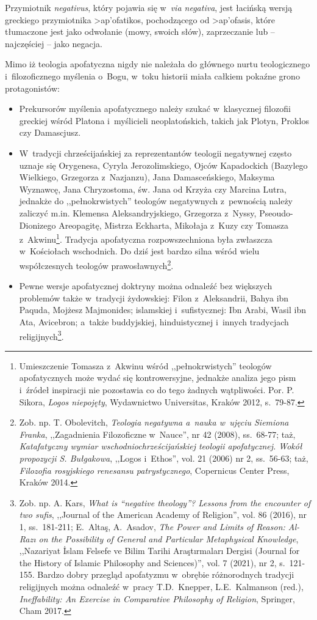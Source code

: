 Przymiotnik \textit{negativus}, który pojawia się w~\textit{via negativa}, jest łacińską wersją greckiego przymiotnika \textgreek{>ap'ofatikos}, pochodzącego od \textgreek{>ap'ofasis}, które tłumaczone jest jako odwołanie (mowy, swoich słów), zaprzeczanie lub -- najczęściej -- jako negacja.

Mimo iż teologia apofatyczna nigdy nie należała do głównego nurtu teologicznego i~filozoficznego myślenia o~Bogu, w~toku historii miała całkiem pokaźne grono protagonistów:

\begin{itemize}
\item Prekursorów myślenia apofatycznego należy szukać w~klasycznej filozofii greckiej wśród Platona i~myślicieli neoplatońskich, takich jak Plotyn, Proklos czy Damascjusz.
\item W~tradycji chrześcijańskiej za reprezentantów teologii negatywnej często uznaje się Orygenesa, Cyryla Jerozolimskiego, Ojców Kapadockich (Bazylego Wielkiego, Grzegorza z~Nazjanzu), Jana Damasceńskiego, Maksyma Wyznawcę, Jana Chryzostoma, św. Jana od Krzyża czy Marcina Lutra, jednakże do ,,pełnokrwistych'' teologów negatywnych z~pewnością należy zaliczyć m.in. Klemensa Aleksandryjskiego, Grzegorza z~Nyssy, Pseoudo-Dionizego Areopagitę, Mistrza Eckharta, Mikołaja z~Kuzy czy Tomasza z~Akwinu\footnote{Umieszczenie Tomasza z~Akwinu wśród ,,pełnokrwistych'' teologów apofatycznych może wydać się kontrowersyjne, jednakże analiza jego pism i~źródeł inspiracji nie pozostawia co do tego żadnych wątpliwości. Por. P. Sikora, \textit{Logos niepojęty}, Wydawnictwo Universitas, Kraków 2012, s.~79-87.}. Tradycja apofatyczna rozpowszechniona była zwłaszcza w~Kościołach wschodnich. Do dziś jest bardzo silna wśród wielu współczesnych teologów prawosławnych\footnote{Zob. np. T. Obolevitch, \textit{Teologia negatywna a~nauka w~ujęciu Siemiona Franka}, ,,Zagadnienia Filozoficzne w~Nauce'', nr 42 (2008), ss.~68-77; taż, \textit{Katafatyczny wymiar wschodniochrześcijańskiej teologii apofatycznej. Wokół propozycji S. Bułgakowa}, ,,Logos i~Ethos'', vol. 21 (2006) nr 2, ss.~56-63; taż, \textit{Filozofia rosyjskiego renesansu patrystycznego}, Copernicus Center Press, Kraków 2014.}.
\item Pewne wersje apofatycznej doktryny można odnaleźć bez większych problemów także w~tradycji żydowskiej: Filon z~Aleksandrii, Bahya ibn Paquda, Mojżesz Majmonides; islamskiej i~sufistycznej: Ibn Arabi, Wasil ibn Ata, Avicebron; a~także buddyjskiej, hinduistycznej i~innych tradycjach religijnych\footnote{Zob. np. A. Kars, \textit{What is ``negative theology''? Lessons from the encounter of two sufis}, ,,Journal of the American Academy of Religion'', vol. 86 (2016), nr 1, ss.~181-211; E.~Altaş, A.~Asadov, \textit{The Power and Limits of Reason: Al-Razı on the Possibility of General and Particular Metaphysical Knowledge}, ,,Nazariyat İslam Felsefe ve Bilim Tarihi Araştırmaları Dergisi (Journal for the History of Islamic Philosophy and Sciences)'', vol. 7 (2021), nr 2, s.~121-155. Bardzo dobry przegląd apofatyzmu w~obrębie różnorodnych tradycji religijnych można odnaleźć w~pracy T.D.~Knepper, L.E.~Kalmanson (red.), \textit{Ineffability: An Exercise in Comparative Philosophy of Religion}, Springer, Cham 2017.}.
\end{itemize}
